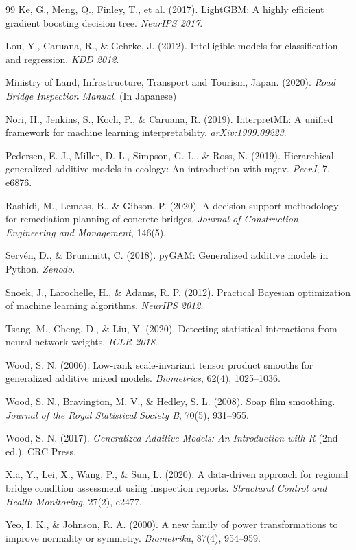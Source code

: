 \documentclass[twocolumn]{article}
\begin{document}
\begin{thebibliography}{99}
Ke, G., Meng, Q., Finley, T., et al. (2017). LightGBM: A highly efficient gradient boosting decision tree. \textit{NeurIPS 2017}.

Lou, Y., Caruana, R., \& Gehrke, J. (2012). Intelligible models for classification and regression. \textit{KDD 2012}.

Ministry of Land, Infrastructure, Transport and Tourism, Japan. (2020). \textit{Road Bridge Inspection Manual}. (In Japanese)

Nori, H., Jenkins, S., Koch, P., \& Caruana, R. (2019). InterpretML: A unified framework for machine learning interpretability. \textit{arXiv:1909.09223}.

Pedersen, E. J., Miller, D. L., Simpson, G. L., \& Ross, N. (2019). Hierarchical generalized additive models in ecology: An introduction with mgcv. \textit{PeerJ}, 7, e6876.

Rashidi, M., Lemass, B., \& Gibson, P. (2020). A decision support methodology for remediation planning of concrete bridges. \textit{Journal of Construction Engineering and Management}, 146(5).

Servén, D., \& Brummitt, C. (2018). pyGAM: Generalized additive models in Python. \textit{Zenodo}.

Snoek, J., Larochelle, H., \& Adams, R. P. (2012). Practical Bayesian optimization of machine learning algorithms. \textit{NeurIPS 2012}.

Tsang, M., Cheng, D., \& Liu, Y. (2020). Detecting statistical interactions from neural network weights. \textit{ICLR 2018}.

Wood, S. N. (2006). Low-rank scale-invariant tensor product smooths for generalized additive mixed models. \textit{Biometrics}, 62(4), 1025--1036.

Wood, S. N., Bravington, M. V., \& Hedley, S. L. (2008). Soap film smoothing. \textit{Journal of the Royal Statistical Society B}, 70(5), 931--955.

Wood, S. N. (2017). \textit{Generalized Additive Models: An Introduction with R} (2nd ed.). CRC Press.

Xia, Y., Lei, X., Wang, P., \& Sun, L. (2020). A data-driven approach for regional bridge condition assessment using inspection reports. \textit{Structural Control and Health Monitoring}, 27(2), e2477.

Yeo, I. K., \& Johnson, R. A. (2000). A new family of power transformations to improve normality or symmetry. \textit{Biometrika}, 87(4), 954--959.

\end{thebibliography}
\end{document}
